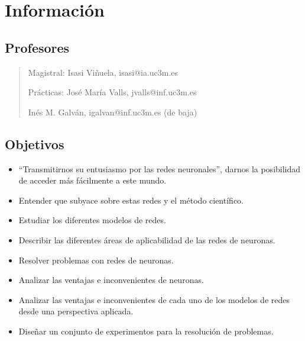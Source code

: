 \documentclass[12pt, twoside, openright]{report} %
\begin{document}
\listoffigures
\thispagestyle{fancy}

\listoftables
\thispagestyle{fancy}





\chapter{Información}

\section{Profesores}
\begin{quote}
	Magistral: Isasi Viñuela, isasi@ia.uc3m.es
	
	Prácticas: José María Valls, jvalls@inf.uc3m.es
	
	Inés M. Galván, igalvan@inf.uc3m.es (de baja)
\end{quote}

\section{Objetivos}
\begin{itemize}
	\item “Transmitirnos su entusiasmo por las redes neuronales”, darnos la posibilidad de acceder más fácilmente a este mundo.
	\item Entender que subyace sobre estas redes y el método científico.
	\item Estudiar los diferentes modelos de redes.
	\item Describir las diferentes áreas de aplicabilidad de las redes de neuronas.
	\item Resolver problemas con redes de neuronas.
	\item Analizar las ventajas e inconvenientes de neuronas.
	\item Analizar las ventajas e inconvenientes de cada uno de los modelos de redes desde una perspectiva aplicada.
	\item Diseñar un conjunto de experimentos para la resolución de problemas.
\end{itemize}
\end{document}
